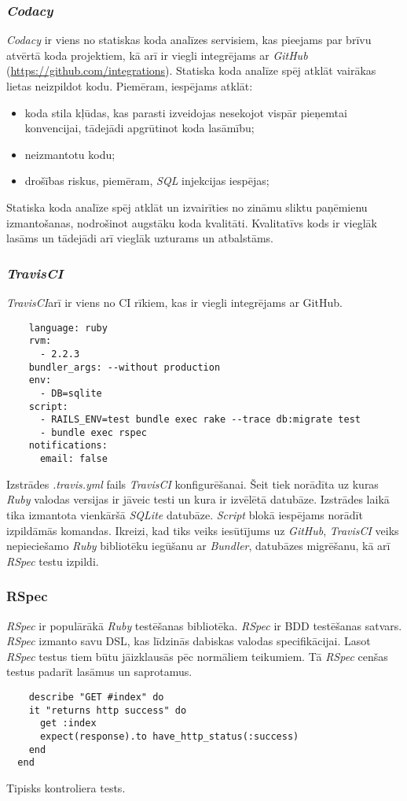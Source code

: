 \subsubsection{\textit{Codacy}}
\textit{Codacy} ir viens no statiskas koda analīzes servisiem, kas pieejams par brīvu atvērtā koda projektiem, kā arī ir viegli integrējams ar \textit{GitHub} (\url{https://github.com/integrations}). Statiska koda analīze spēj atklāt vairākas lietas neizpildot kodu.
Piemēram, iespējams atklāt:
\begin{itemize}
	\item koda stila kļūdas, kas parasti izveidojas nesekojot vispār pieņemtai konvencijai, tādejādi apgrūtinot koda lasāmību;
	\item neizmantotu kodu;
	\item drošības riskus, piemēram, \textit{SQL} injekcijas iespējas;
\end{itemize}
Statiska koda analīze spēj atklāt un izvairīties no zināmu sliktu paņēmienu izmantošanas, nodrošinot augstāku koda kvalitāti. Kvalitatīvs kods ir vieglāk lasāms un tādejādi arī vieglāk uzturams un atbalstāms.

\subsubsection{\textit{TravisCI} }
\textit{TravisCI}arī ir viens no CI rīkiem, kas ir viegli integrējams ar GitHub.
\begin{lstlisting}
	language: ruby
	rvm:
	  - 2.2.3
	bundler_args: --without production
	env:
	  - DB=sqlite
	script:
	  - RAILS_ENV=test bundle exec rake --trace db:migrate test
	  - bundle exec rspec
	notifications:
	  email: false
\end{lstlisting}
Izstrādes \textit{.travis.yml} fails \textit{TravisCI} konfigurēšanai. Šeit tiek norādīta uz kuras \textit{Ruby} valodas versijas ir jāveic testi un kura ir izvēlētā datubāze. Izstrādes laikā tika izmantota vienkāršā \textit{SQLite} datubāze. \textit{Script} blokā iespējams norādīt izpildāmās komandas. Ikreizi, kad tiks veiks iesūtījums uz \textit{GitHub}, \textit{TravisCI} veiks nepieciešamo \textit{Ruby} bibliotēku iegūšanu ar \textit{Bundler}, datubāzes migrēšanu, kā arī \textit{RSpec} testu izpildi.

\subsubsection{RSpec}
\textit{RSpec} ir populārākā \textit{Ruby} testēšanas bibliotēka. \textit{RSpec} ir BDD testēšanas satvars. \textit{RSpec} izmanto savu DSL, kas līdzinās dabiskas valodas specifikācijai. Lasot \textit{RSpec} testus tiem būtu jāizklausās pēc normāliem teikumiem. Tā \textit{RSpec} cenšas testus padarīt lasāmus un saprotamus. \cite{shayRspec}
\begin{lstlisting}
	describe "GET #index" do
    it "returns http success" do
      get :index
      expect(response).to have_http_status(:success)
    end
  end
\end{lstlisting}
Tipisks kontroliera tests.

